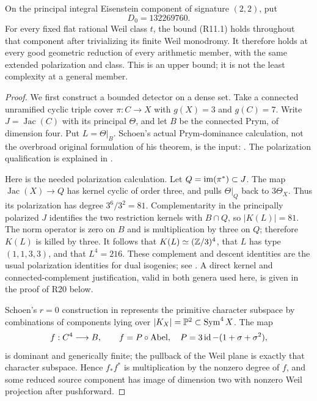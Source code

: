 \begin{theorem}
On the principal integral Eisenstein component of signature $(2,2)$,
put
\[
 D_0=132269760.
\]
For every fixed flat rational Weil class $t$, the bound (R11.1) holds
throughout that component after trivializing its finite Weil monodromy.
It therefore holds at every good geometric reduction of every arithmetic
member, with the same extended polarization and class. This is an upper
bound; it is not the least complexity at a general member.
\end{theorem}
\begin{proof}
We first construct a bounded detector on a dense set. Take a connected
unramified cyclic triple cover $\pi:C\to X$ with $g(X)=3$ and $g(C)=7$.
Write $J=\operatorname{Jac}(C)$ with its principal $\Theta$, and let
$B$ be the connected Prym, of dimension four. Put $L=\Theta|_B$.
Schoen's actual Prym-dominance calculation, not the overbroad original
formulation of his theorem, is the input: \cite[\S3, pp.~26--30]{Schoen1988}.
The polarization qualification is explained in
\cite[p.~330]{Schoen1998}.

Here is the needed polarization calculation. Let $Q=\operatorname{im}(\pi^*)\subset J$.
The map $\operatorname{Jac}(X)\to Q$ has kernel cyclic of order three,
and pulls $\Theta|_Q$ back to $3\Theta_X$. Thus its polarization has
degree $3^6/3^2=81$. Complementarity in the principally polarized $J$
identifies the two restriction kernels with $B\cap Q$, so $|K(L)|=81$.
The norm operator is zero on $B$ and is multiplication by three on $Q$;
therefore $K(L)$ is killed by three. It follows that
$K(L)\simeq(\mathbb Z/3)^4$, that $L$ has type $(1,1,3,3)$, and that $L^4=216$.
These complement and descent identities are the usual polarization
identities for dual isogenies; see \cite[\S11, pp.~17--18; Theorem13.3,
p.~25; Proposition16.8 and Remark16.9, p.~33]{MilneAV}. A direct kernel
and connected-complement justification, valid in both genera used here,
is given in the proof of R20 below.

Schoen's $r=0$ construction in \cite[Theorem~2.0 and pp.~12--13,
paragraph immediately before (2.3)]{Schoen1988} represents the primitive
character subspace by combinations of components lying over
$|K_X|=\mathbb P^2\subset\operatorname{Sym}^4X$.
The map
\[
 f:C^4\longrightarrow B,\qquad
 f=P\circ\operatorname{Abel},\quad
 P=3\operatorname{id}-(1+\sigma+\sigma^2),
\]
is dominant and generically finite; the pullback of the Weil plane is
exactly that character subspace. Hence $f_*f^*$ is multiplication by
the nonzero degree of $f$, and some reduced source component has image
of dimension two with nonzero Weil projection after pushforward.


\end{proof}
